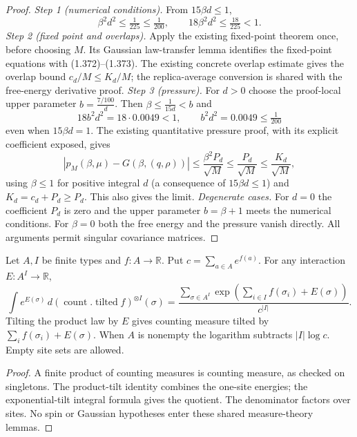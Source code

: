 \begin{proof}
\leanok
\emph{Step 1 (numerical conditions).} From $15\beta d\le1$,
\[
\beta^2d^2\le\tfrac1{225}\le\tfrac1{200},\qquad 18\beta^2d^2\le\tfrac{18}{225}<1 .
\]
\emph{Step 2 (fixed point and overlaps).} Apply the existing fixed-point theorem once, before choosing $M$. Its Gaussian law-transfer lemma identifies the fixed-point equations with (1.372)--(1.373). The existing concrete overlap estimate gives the overlap bound $c_d/M\le K_d/M$; the replica-average conversion is shared with the free-energy derivative proof.
\emph{Step 3 (pressure).} For $d>0$ choose the proof-local upper parameter $b=\frac{7/100}d$. Then $\beta\le\frac1{15d}<b$ and
\[
18b^2d^2=18\cdot0.0049<1,\qquad b^2d^2=0.0049\le\tfrac1{200}
\]
even when $15\beta d=1$. The existing quantitative pressure proof, with its explicit coefficient exposed, gives
\[
|p_M(\beta,\mu)-G(\beta,(q,\rho))|\le\frac{\beta^2P_d}{\sqrt M}\le\frac{P_d}{\sqrt M}\le\frac{K_d}{\sqrt M},
\]
using $\beta\le1$ for positive integral $d$ (a consequence of $15\beta d\le1$) and $K_d=c_d+P_d\ge P_d$. This also gives the limit.
\emph{Degenerate cases.} For $d=0$ the coefficient $P_d$ is zero and the upper parameter $b=\beta+1$ meets the numerical conditions. For $\beta=0$ both the free energy and the pressure vanish directly. All arguments permit singular covariance matrices.
\end{proof}

\begin{lemma}\label{lem:sg-tal:vector-product-normalization}
\leanok
Let $A,I$ be finite types and $f:A\to\mathbb R$. Put $c=\sum_{a\in A}e^{f(a)}$.
For any interaction $E:A^I\to\mathbb R$,
\[
 \int e^{E(\sigma)}\,d(\operatorname{count}.\operatorname{tilted}f)^{\otimes I}(\sigma)
 =\frac{\sum_{\sigma\in A^I}\exp(\sum_{i\in I}f(\sigma_i)+E(\sigma))}{c^{|I|}}.
\]
Tilting the product law by $E$ gives counting measure tilted by $\sum_i f(\sigma_i)+E(\sigma)$.
When $A$ is nonempty the logarithm subtracts $|I|\log c$. Empty site sets are allowed.
\end{lemma}
\begin{proof}
A finite product of counting measures is counting measure, as checked on singletons.
The product-tilt identity combines the one-site energies; the exponential-tilt integral
formula gives the quotient. The denominator factors over sites. No spin or Gaussian
hypotheses enter these shared measure-theory lemmas.
\end{proof}

